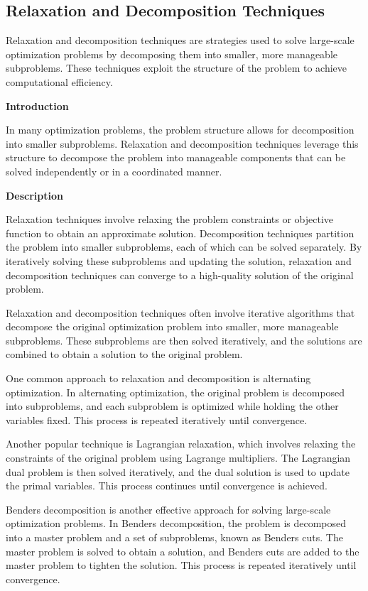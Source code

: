 \documentclass[12pt]{book} %
\begin{document}
\subsection{Relaxation and Decomposition Techniques}

Relaxation and decomposition techniques are strategies used to solve large-scale optimization problems by decomposing them into smaller, more manageable subproblems. These techniques exploit the structure of the problem to achieve computational efficiency.

\textbf{Introduction}

In many optimization problems, the problem structure allows for decomposition into smaller subproblems. Relaxation and decomposition techniques leverage this structure to decompose the problem into manageable components that can be solved independently or in a coordinated manner.

\textbf{Description}

Relaxation techniques involve relaxing the problem constraints or objective function to obtain an approximate solution. Decomposition techniques partition the problem into smaller subproblems, each of which can be solved separately. By iteratively solving these subproblems and updating the solution, relaxation and decomposition techniques can converge to a high-quality solution of the original problem.

Relaxation and decomposition techniques often involve iterative algorithms that decompose the original optimization problem into smaller, more manageable subproblems. These subproblems are then solved iteratively, and the solutions are combined to obtain a solution to the original problem.

One common approach to relaxation and decomposition is alternating optimization. In alternating optimization, the original problem is decomposed into subproblems, and each subproblem is optimized while holding the other variables fixed. This process is repeated iteratively until convergence.

Another popular technique is Lagrangian relaxation, which involves relaxing the constraints of the original problem using Lagrange multipliers. The Lagrangian dual problem is then solved iteratively, and the dual solution is used to update the primal variables. This process continues until convergence is achieved.

Benders decomposition is another effective approach for solving large-scale optimization problems. In Benders decomposition, the problem is decomposed into a master problem and a set of subproblems, known as Benders cuts. The master problem is solved to obtain a solution, and Benders cuts are added to the master problem to tighten the solution. This process is repeated iteratively until convergence.
\end{document}
